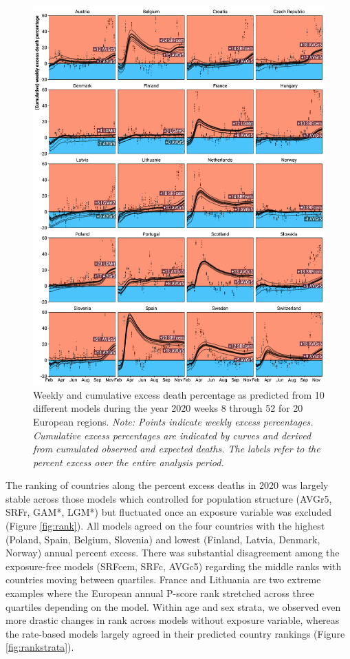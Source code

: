 \documentclass[12pt]{article}
\begin{document}
\begin{figure}
\caption{Weekly and cumulative excess death percentage as predicted from 10 different models during the year 2020 weeks 8 through 52 for 20 European regions. \emph{Note: Points indicate weekly excess percentages. Cumulative excess percentages are indicated by curves and derived from cumulated observed and expected deaths. The labels refer to the percent excess over the entire analysis period.}}
\label{fig:excess}
\vspace{-1em}\includegraphics{excess.pdf}
\end{figure}

The ranking of countries along the percent excess deaths in 2020 was largely stable across those models which controlled for population structure (AVGr5, SRFr, GAM*, LGM*) but fluctuated once an exposure variable was excluded (Figure \ref{fig:rank}). All models agreed on the four countries with the highest (Poland, Spain, Belgium, Slovenia) and lowest (Finland, Latvia, Denmark, Norway) annual percent excess. There was substantial disagreement among the exposure-free models (SRFcem, SRFc, AVGc5) regarding the middle ranks with countries moving between quartiles. France and Lithuania are two extreme examples where the European annual P-score rank stretched across three quartiles depending on the model. Within age and sex strata, we observed even more drastic changes in rank across models without exposure variable, whereas the rate-based models largely agreed in their predicted country rankings (Figure \ref{fig:rankstrata}).
\end{document}
